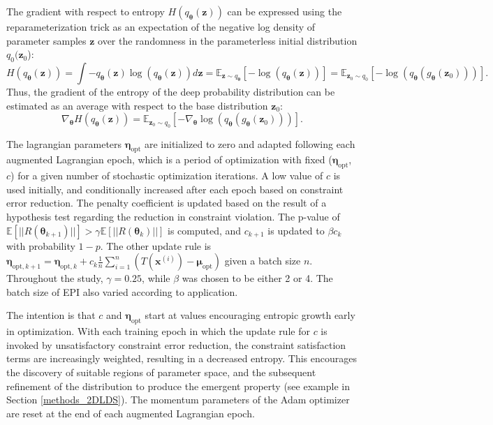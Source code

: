\documentclass[11pt]{article}
\begin{document}
The gradient with respect to entropy $H(q_{\bm{\theta}}(\mathbf{z}))$ can be expressed using the reparameterization trick as an expectation of the negative log density of parameter samples $\mathbf{z}$ over the randomness in the parameterless initial distribution $q_0(\mathbf{z}_0$):
\begin{equation}
H(q_{\bm{\theta}}(\mathbf{z})) = \int - q_{\bm{\theta}}(\mathbf{z}) \log(q_{\bm{\theta}}(\mathbf{z})) d\mathbf{z} = \mathbb{E}_{\mathbf{z} \sim q_{\bm{\theta}}}\left[-\log(q_{\bm{\theta}}(\mathbf{z})) \right] = \mathbb{E}_{\mathbf{z}_0 \sim q_0}\left[-\log(q_{\bm{\theta}}(g_{\bm{\theta}}(\mathbf{z}_0))) \right].
\end{equation}
Thus, the gradient of the entropy of the deep probability distribution can be estimated as an average with respect to the base distribution $\mathbf{z}_0$:
\begin{equation}
\nabla_{\bm{\theta}} H(q_{\bm{\theta}}(\mathbf{z})) = \mathbb{E}_{\mathbf{z}_0 \sim q_0}\left[- \nabla_{\bm{\theta}} \log(q_{\bm{\theta}}(g_{\bm{\theta}}(\mathbf{z}_0))) \right].
\end{equation}

The lagrangian parameters $\bm{\eta}_{\text{opt}}$ are initialized to zero and adapted following each augmented Lagrangian epoch, which is a period of optimization with fixed ($\bm{\eta}_{\text{opt}}$, $c$) for a given number of stochastic optimization iterations. 
A low value of $c$ is used initially, and conditionally increased after each epoch based on constraint error reduction.
The penalty coefficient is updated based on the result of a hypothesis test regarding the reduction in constraint violation.  
The p-value of $\mathbb{E}[||R(\bm{\theta}_{k+1})||] > \gamma \mathbb{E} \left[||R(\bm{\theta}_{k})|| \right]$ is computed, and $c_{k+1}$ is updated  to $\beta c_k$ with probability $1-p$.  
The other update rule is $\bm{\eta}_{\text{opt},k+1} = \bm{\eta}_{\text{opt},k} + c_k \frac{1}{n} \sum_{i=1}^n (T(\mathbf{x}^{(i)}) - \bm{\mu}_{\text{opt}})$ given a batch size $n$.
Throughout the study, $\gamma = 0.25$, while $\beta$ was chosen to be either 2 or 4.  The batch size of EPI also varied according to application.

The intention is that $c$ and $\bm{\eta}_{\text{opt}}$ start at values encouraging entropic growth early in optimization.  
With each training epoch in which the update rule for $c$ is invoked by unsatisfactory constraint error reduction, the constraint satisfaction terms are increasingly weighted, resulting in a decreased entropy.
This encourages the discovery of suitable regions of parameter space, and the subsequent refinement of the distribution to produce the emergent property (see example in Section \ref{methods_2DLDS}).
The momentum parameters of the Adam optimizer are reset at the end of each augmented Lagrangian epoch.
\end{document}
